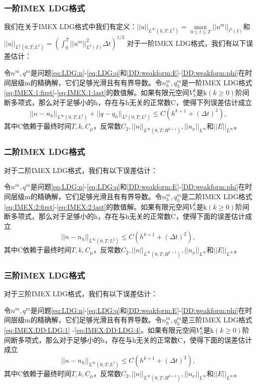 \subsubsection{一阶IMEX LDG格式}
我们在关于IMEX LDG格式中我们有定义：$||u||_{L^{\infty}(0,T;L^2)}  = \max \limits_{0 \leq t \leq T}||u^m||_{l^2(I)}$和$||u||_{L^2(0,T;L^2)} = (\int_{0}^{T}||u^m||_{L^2(I)}^2\Delta t)^{1/2}$
对于一阶IMEX LDG格式，我们有以下误差估计\cite{liu2016analysis}：
\begin{theorem}
    令$n^m,q^m$是问题\eqref{eq:LDG:n}-\eqref{eq:LDG:q}和\eqref{DD:weakform:E}-\eqref{DD:weakform:phi}在时间层级m的精确解，它们足够光滑且有有界导数。令$n_h^m,q_h^m$是一阶IMEX LDG格式\eqref{eq:IMEX:1:first}-\eqref{eq:IMEX:1:last}的数值解。如果有限元空间$V_h^k$是k$(k\geq  0)$阶间断多项式，那么对于足够小的h，存在与h无关的正常数C，使得下列误差估计成立
    \begin{equation}
        ||n-n_h||_{L^{\infty}(0,T;L^2)} + ||q - q_h||_{L^2(0,T;L^2)} \leq C(h^{k+1} + (\Delta t)^2), \label{eq:IMEX:es:2}
    \end{equation}
    其中C依赖于最终时间$T,k,C_{\mu}$，反常数$C_2, ||n||_{L^{\infty}(0,T;H^{k+1})}, ||n_x||_{L^{\infty}}$和$||E||_{L^{\infty}}$。
\end{theorem}
\subsubsection{二阶IMEX LDG格式}
对于二阶IMEX LDG格式，我们有以下误差估计\cite{liu2016analysis}：
\begin{theorem}
    令$n^m,q^m$是问题\eqref{eq:LDG:n}-\eqref{eq:LDG:q}和\eqref{DD:weakform:E}-\eqref{DD:weakform:phi}在时间层级m的精确解，它们足够光滑且有有界导数。令$n_h^m,q_h^m$是二阶IMEX LDG格式\eqref{eq:IMEX:2:first}-\eqref{eq:IMEX:2:last}的数值解。如果有限元空间$V_h^k$是k$(k\geq  0)$阶间断多项式，那么对于足够小的h，存在与h无关的正常数C，使得下面的误差估计成立
    \begin{equation}
        ||n-n_h||_{L^{\infty}(0,T;L^2)} \leq C(h^{k+1} + (\Delta t)^2), \label{eq:IMEX:es:2}
    \end{equation}
    其中C依赖于最终时间$T,k,C_{\mu}$，反常数$C_2, ||n||_{L^{\infty}(0,T;H^{k+1})}, ||n_x||_{L^{\infty}}$和$||E||_{L^{\infty}}$。
\end{theorem}
\subsubsection{三阶IMEX LDG格式}
对于三阶IMEX LDG格式，我们有以下误差估计\cite{liu2016analysis}：
\begin{theorem}
    令$n^m,q^m$是问题\eqref{eq:LDG:n}-\eqref{eq:LDG:q}和\eqref{DD:weakform:E}-\eqref{DD:weakform:phi}在时间层级m的精确解，它们足够光滑且有有界导数。令$n_h^m,q_h^m$是三阶IMEX LDG格式\eqref{eq:IMEX:DD:LDG:1} -\eqref{eq:IMEX:DD:LDG:4}。如果有限元空间$V_h^k$是k$(k\geq  0)$阶间断多项式，那么对于足够小的h，存在与h无关的正常数C，使得下面的误差估计成立
    \begin{equation}
        ||n-n_h||_{L^{\infty}(0,T;L^2)} \leq C(h^{k+1} + (\Delta t)^3), \label{eq:IMEX:es:3}
    \end{equation}
    其中C依赖于最终时间$T,k,C_{\mu}$，反常数$C_2, ||n||_{L^{\infty}(0,T;H^{k+1})}, ||n_x||_{L^{\infty}}$和$||E||_{L^{\infty}}$。
\end{theorem}
